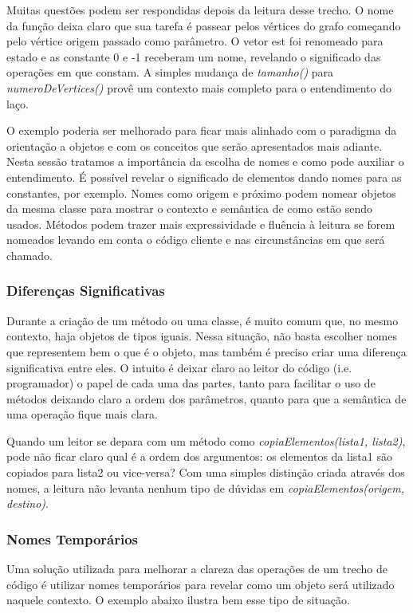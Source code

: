 Muitas questões podem ser respondidas depois da leitura desse trecho. O nome da função deixa claro que sua tarefa é passear pelos vértices do grafo começando pelo vértice origem passado como parâmetro. O vetor est foi renomeado para estado e as constante 0 e -1 receberam um nome, revelando o significado das operações em que constam. A simples mudança de \textit{tamanho()} para \textit{numeroDeVertices()} provê um contexto mais completo para o entendimento do laço.
	
O exemplo poderia ser melhorado para ficar mais alinhado com o paradigma da orientação a objetos e com os conceitos que serão apresentados mais adiante. Nesta sessão tratamos a importância da escolha de nomes e como pode auxiliar o entendimento. É possível revelar o significado de elementos dando nomes para as constantes, por exemplo. Nomes como origem e próximo podem nomear objetos da mesma classe para mostrar o contexto e semântica de como estão sendo usados. Métodos podem trazer mais expressividade e fluência à leitura se forem nomeados levando em conta o código cliente e nas circunstâncias em que será chamado.

\subsubsection{Diferenças Significativas}
Durante a criação de um método ou uma classe, é muito comum que, no mesmo contexto, haja  objetos de tipos iguais. Nessa situação, não basta escolher nomes que representem bem o que é o objeto, mas também é preciso criar uma diferença significativa entre eles. O intuito é deixar claro ao leitor do código  (i.e. programador) o papel de cada uma das partes, tanto para facilitar o uso de métodos deixando claro a ordem dos parâmetros, quanto para que a semântica de uma operação fique mais clara.
	
Quando um leitor se depara com um método como \textit{copiaElementos(lista1, lista2)}, pode não ficar claro qual é a ordem dos argumentos: os elementos da lista1 são copiados para lista2 ou vice-versa? Com uma simples distinção criada através dos nomes, a leitura não levanta nenhum tipo de dúvidas em \textit{copiaElementos(origem, destino)}.

\subsubsection{Nomes Temporários}
Uma solução utilizada para melhorar a clareza das operações de um trecho de código é utilizar nomes temporários para revelar como um objeto será utilizado naquele contexto. O exemplo abaixo ilustra bem esse tipo de situação.

